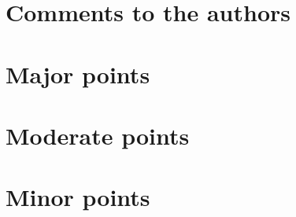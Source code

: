 \documentclass[letterpaper,11pt]{texReview}
\begin{document}
\revtitle{}

\revjournal{\ieeetnnls}

\revid{}

\revauthors{}

\revlogo{\ieeelogo}


\makereviewtitle



\section{Comments to the authors}

\section{Major points}

\section{Moderate points}

\section{Minor points}



\end{document}
